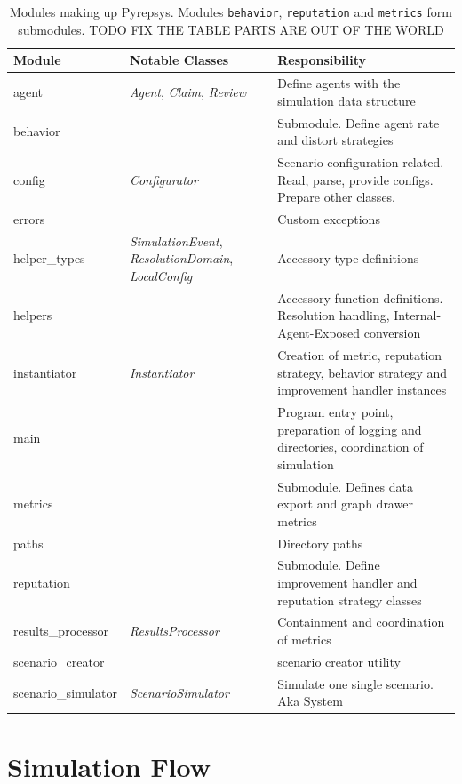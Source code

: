 \documentclass[%
    ]{\PathToTumTemplate/thesis/tum_thesis}
\begin{document}
\begin{table}[tbp]
\centering
\begin{tabular}{@{}lll@{}}
\toprule
\textbf{Module} & \textbf{Notable Classes} & \textbf{Responsibility}    \\ \midrule
agent               & \emph{Agent}, \emph{Claim}, \emph{Review} &Define agents with the simulation data structure \\
behavior            &  &Submodule. Define agent rate and distort strategies \\
config              & \emph{Configurator} &Scenario configuration related. Read, parse, provide configs. Prepare other classes. \\
errors              &  &Custom exceptions \\
helper\_types        & \emph{SimulationEvent}, \emph{ResolutionDomain}, \emph{LocalConfig}& Accessory type definitions \\
helpers             &  &Accessory function definitions. Resolution handling, Internal-Agent-Exposed conversion \\
instantiator        & \emph{Instantiator} & Creation of metric, reputation strategy, behavior strategy and improvement handler instances \\
main                &  &Program entry point, preparation of logging and directories, coordination of simulation \\
metrics             &  &Submodule. Defines data export and graph drawer metrics \\
paths               &  &Directory paths \\
reputation          &  &Submodule. Define improvement handler and reputation strategy classes \\
results\_processor   & \emph{ResultsProcessor} &Containment and coordination of metrics \\
scenario\_creator    &  &scenario creator utility \\
scenario\_simulator  & \emph{ScenarioSimulator} &Simulate one single scenario. Aka System \\
\bottomrule
\end{tabular}
\caption{
	Modules making up Pyrepsys.
	Modules \texttt{behavior}, \texttt{reputation} and \texttt{metrics} form submodules.
	TODO FIX THE TABLE PARTS ARE OUT OF THE WORLD
}
\label{tab:pyrepsys_modules}
\end{table}

\section{Simulation Flow}\label{sec:impl_simulation}
\end{document}
